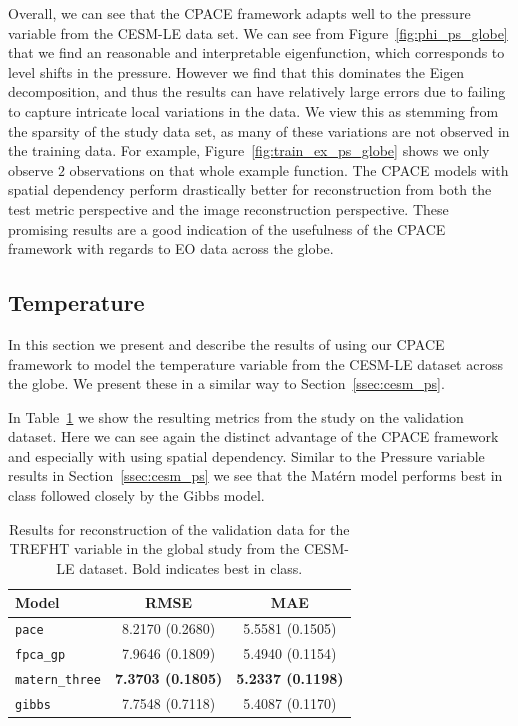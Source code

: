 Overall, we can see that the CPACE framework adapts well to the pressure variable from the CESM-LE data set.
We can see from Figure~\ref{fig:phi_ps_globe} that we find an reasonable and interpretable eigenfunction, which corresponds to level shifts in the pressure.
However we find that this dominates the Eigen decomposition, and thus the results can have relatively large errors due to failing to capture intricate local variations in the data.
We view this as stemming from the sparsity of the study data set, as many of these variations are not observed in the training data.
For example, Figure~\ref{fig:train_ex_ps_globe} shows we only observe $2$ observations on that whole example function.
The CPACE models with spatial dependency perform drastically better for reconstruction from both the test metric perspective and the image reconstruction perspective. 
These promising results are a good indication of the usefulness of the CPACE framework with regards to EO data across the globe.

\subsection{Temperature \label{ssec:cesm_trefht}}
In this section we present and describe the results of using our CPACE framework to model the temperature variable from the CESM-LE dataset across the globe.
We present these in a similar way to Section~\ref{ssec:cesm_ps}.

In Table~\ref{tab:train_cesm_trefht_globe} we show the resulting metrics from the study on the validation dataset.
Here we can see again the distinct advantage of the CPACE framework and especially with using spatial dependency.
Similar to the Pressure variable results in Section~\ref{ssec:cesm_ps} we see that the Mat\'ern model performs best in class followed closely by the Gibbs model.

\begin{table}
	\caption[Results for TREFHT variable on validation data in the Global study]{Results for reconstruction of the validation data for the TREFHT variable in the global study from the CESM-LE dataset. Bold indicates best in class.}
	\centering
	\label{tab:train_cesm_trefht_globe}
	\begin{tabular}{lcc}
		\toprule
		\textbf{Model} & \textbf{RMSE} & \textbf{MAE} \\
		\midrule
		\verb*|pace| & 8.2170	(0.2680) & 5.5581 (0.1505) \\
		\verb*|fpca_gp| & 7.9646	(0.1809) & 5.4940 (0.1154) \\
		\verb*|matern_three| & \textbf{7.3703 (0.1805)}& \textbf{5.2337 (0.1198)}\\
		\verb*|gibbs| & 7.7548 (0.7118) & 5.4087 (0.1170)\\
		\bottomrule
	\end{tabular}
\end{table}

